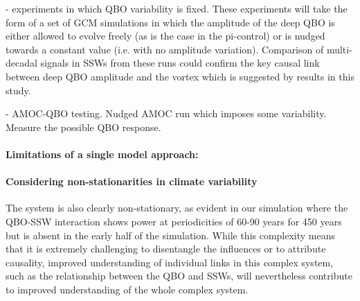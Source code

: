 -  experiments in which QBO variability is fixed. These experiments will take the form of a set of GCM simulations in which the amplitude of the deep QBO is either allowed to evolve freely (as is the case in the pi-control) or is nudged towards a constant value (i.e. with no amplitude variation). Comparison of multi-decadal signals in SSWs from these runs could confirm the key causal link between deep QBO amplitude and the vortex which is suggested by results in this study.

- AMOC-QBO testing. Nudged AMOC run which imposes some variability. Measure the possible QBO response. 














\paragraph{Limitations of a single model approach:}




\paragraph{Considering non-stationarities in climate variability}
The system is also clearly non-stationary, as evident in our simulation where the QBO-SSW interaction shows power at periodicities of 60-90 years for 450 years but is absent in the early half of the simulation. While this complexity means that it is extremely challenging to disentangle the influences or to attribute causality, improved understanding of individual links in this complex system, such as the relationship between the QBO and SSWs, will nevertheless contribute to improved understanding of the whole complex system.  

